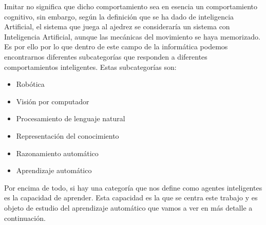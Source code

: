 Imitar no significa que dicho comportamiento sea en esencia un comportamiento cognitivo, sin embargo, según la definición que se ha dado de inteligencia Artificial, el sistema que juega al ajedrez se consideraría un sistema con Inteligencia Artificial, aunque las mecánicas del movimiento se haya memorizado. Es por ello por lo que dentro de este campo de la informática podemos encontrarnos diferentes subcategorías que responden a diferentes comportamientos inteligentes. Estas subcategorías son:
\begin{itemize}
\item Robótica
\item Visión por computador
\item Procesamiento de lenguaje natural 
\item Representación del conocimiento
\item Razonamiento automático
\item Aprendizaje automático
\end{itemize}

Por encima de todo, si hay una categoría que nos define como agentes inteligentes es la capacidad de aprender. Esta capacidad es la que se centra este trabajo y es objeto de estudio del aprendizaje automático que vamos a ver en más detalle a continuación.
\newline